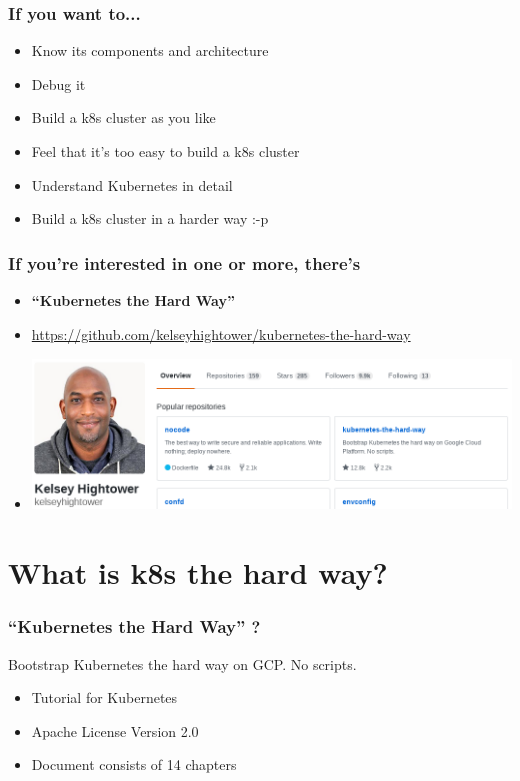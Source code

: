 \documentclass[aspectratio=169,11pt,hyperref={colorlinks=true}]{beamer}
\begin{document}
\begin{frame}
  \frametitle{If you want to...}
  \begin{itemize}
    \item Know its components and architecture
    \item Debug it
    \item Build a k8s cluster as you like
    \item Feel that it's too easy to build a k8s cluster
    \item Understand Kubernetes in detail
    \item Build a k8s cluster in a harder way :-p
  \end{itemize}
\end{frame}

\begin{frame}
  \frametitle{If you're interested in one or more, there's}
  \begin{itemize}
    \item[] \Huge{\bf ``Kubernetes the Hard Way''}\large{}
    \item \url{https://github.com/kelseyhightower/kubernetes-the-hard-way}
    \item[] \includegraphics[height=40mm]{images/kelseyhightower_overview.png}
  \end{itemize}
\end{frame}

\section{What is k8s the hard way?}
\begin{frame}
  \frametitle{``Kubernetes the Hard Way'' ?}
  Bootstrap Kubernetes the hard way on GCP. No scripts.
  \begin{itemize}
    \item Tutorial for Kubernetes
    \item Apache License Version 2.0
    \item Document consists of 14 chapters
  \end{itemize}
\end{frame}
\end{document}
